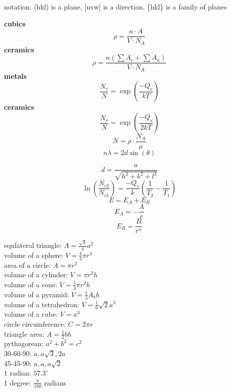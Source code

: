 \documentclass{article}
\begin{document}
notation: (hkl) is a plane, [uvw] is a direction, \{hkl\} is a family of planes



\begin{multicols}{3}
    \centering \textbf{cubics}
    \[ 
        \rho = \frac{n \cdot A}{V \cdot N_A}
    \]
    \textbf{ceramics}
    \[ 
        \rho = \frac{n \left( \sum A_c + \sum A_a \right)}{V \cdot N_A}
    \]
    \textbf{metals}
    \[
        \frac{N_v}{N} = \exp\left( \frac{-Q_v}{kT} \right)
    \]
    \textbf{ceramics}
    \[
        \frac{N_s}{N} = \exp\left( \frac{-Q_s}{2kT} \right)
    \]
    \[ 
    N = \rho \cdot \frac{N_A}{\mu}
    \]
    \[
        n\lambda = 2d\sin(\theta)
    \]

    \[ 
        d = \frac{a}{\sqrt{h^2 + k^2 + l^2}} 
    \]
    \[ \ln \left( \frac{N_{v2}}{N_{v1}} \right) = \frac{- Q_v}{k} \left( \frac{1}{T_2} - \frac{1}{T_1} \right) \]
    \[ E = E_A + E_R  \]
    \[ E_A = -\frac{A}{r} \]
    \[ E_R = \frac{B}{r^n} \]
\end{multicols}

\vspace{2em}

\small
\raggedright
\begin{multicols}{4} 
    equlateral triangle: $A = \frac{\sqrt{3}}{4} a^2$ \\
    volume of a sphere: $V = \frac{4}{3} \pi r^3$\\
    area of a circle: $A = \pi r^2$\\
    volume of a cylinder: $V = \pi r^2 h$\\
    volume of a cone: $V = \frac{1}{3} \pi r^2 h$ \\
    volume of a pyramid: $V = \frac{1}{3} A_b h$\\
    volume of a tetrahedron: $V = \frac{1}{6} \sqrt{2} a^3$\\
    volume of a cube: $V = a^3$ \\
    circle circumference: $C = 2 \pi r$\\
    triangle area: $A = \frac{1}{2} b h$\\
    pythagorean: $a^2 + b^2 = c^2$\\
    30-60-90: $a, a\sqrt{3}, 2a$\\
    45-45-90: $a, a, a\sqrt{2}$\\
    1 radian: $57.3^\circ$\\
    1 degree: $\frac{\pi}{180}$ radians\\
\end{multicols}
\end{document}
